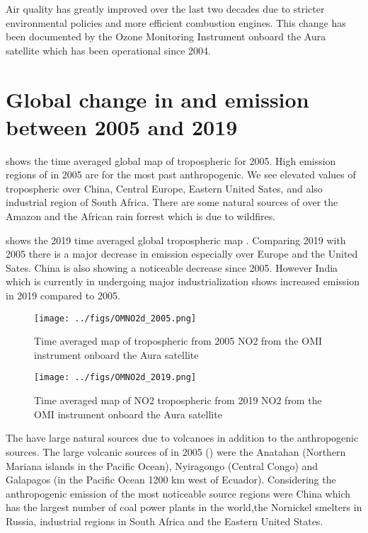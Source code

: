 Air quality has greatly improved over the last two decades due to stricter environmental
policies and more efficient combustion engines. This change has been documented by the 
Ozone Monitoring Instrument onboard the Aura satellite which has been operational since 2004.   
\section*{Global change in  and  emission between 2005 and 2019} 
 shows the time averaged global map of tropospheric 
 for 2005. High emission regions of  in 2005 are for the most past anthropogenic. We see elevated values of tropospheric  over 
China, Central Europe, Eastern United Sates, and also industrial region of South Africa. There are some natural sources of  over the Amazon and the African rain forrest which is due to wildfires.  

 shows the 2019 time averaged global tropospheric
map  . Comparing 2019 with 2005 there is a major 
decrease in  emission especially over Europe and the United Sates. China is also 
showing a noticeable decrease since 2005. However India which is currently in undergoing 
major industrialization shows increased  emission in 2019 compared to 2005. 

\begin{figure}[htbp]
    \centering
        \texttt{[image: ../figs/OMNO2d\_2005.png]}
    \caption{Time averaged map of  tropospheric from 2005 NO2 from the OMI instrument
    onboard the Aura satellite   }
    \label{fig:OMI_global_2005NO2}
\end{figure}

\begin{figure}[htpb]
    \centering
        \texttt{[image: ../figs/OMNO2d\_2019.png]}
    \caption{Time averaged map of NO2 tropospheric from 2019 NO2 from the OMI instrument  
    onboard the Aura satellite}
    \label{fig:OMI_global_2019NO2}
\end{figure}

The  have large natural sources due to volcanoes in addition to the
anthropogenic sources. The large volcanic sources of  
in 2005 () were the Anatahan (Northern Mariana 
islands in the Pacific Ocean), Nyiragongo (Central Congo) and Galapagos 
(in the Pacific Ocean 1200 km west of Ecuador). Considering the anthropogenic 
emission of  the most noticeable source regions were China 
which has the largest number of coal power plants in the world,the 
Nornickel smelters in Russia, industrial regions in South Africa and the Eastern United States.   

